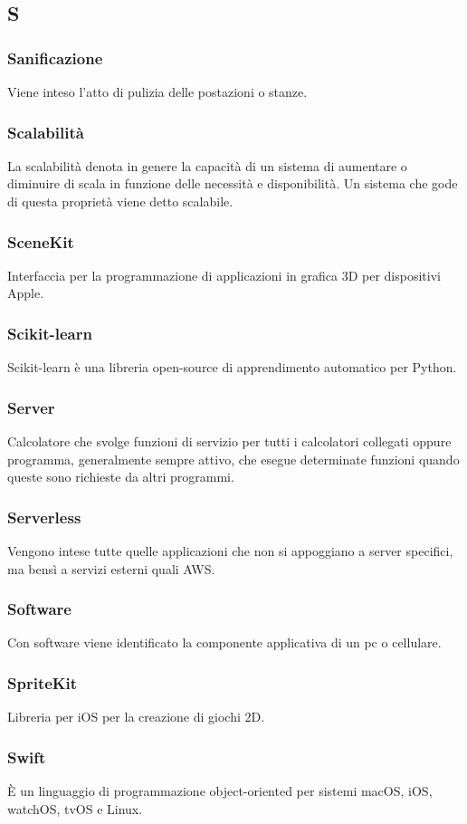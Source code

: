 \subsection*{S}
\subsubsection*{Sanificazione} Viene inteso l'atto di pulizia delle postazioni o stanze.
\subsubsection*{Scalabilità} La scalabilità denota in genere la capacità di un sistema di aumentare o diminuire di scala in funzione delle necessità e disponibilità. Un sistema che gode di questa proprietà viene detto scalabile.
\subsubsection*{SceneKit} Interfaccia per la programmazione di applicazioni in grafica 3D per dispositivi Apple.
\subsubsection*{Scikit-learn} Scikit-learn è una libreria open-source di apprendimento automatico per Python.
\subsubsection*{Server} Calcolatore che svolge funzioni di servizio per tutti i calcolatori collegati oppure programma, generalmente sempre attivo, che esegue determinate funzioni quando queste sono richieste da altri programmi.
\subsubsection*{Serverless} Vengono intese tutte quelle applicazioni che non si appoggiano a server specifici, ma bensì a servizi esterni quali AWS.
\subsubsection*{Software} Con software viene identificato la componente applicativa di un pc o cellulare.
\subsubsection*{SpriteKit} Libreria per iOS per la creazione di giochi 2D.
\subsubsection*{Swift} È un linguaggio di programmazione object-oriented per sistemi macOS, iOS, watchOS, tvOS e Linux.
